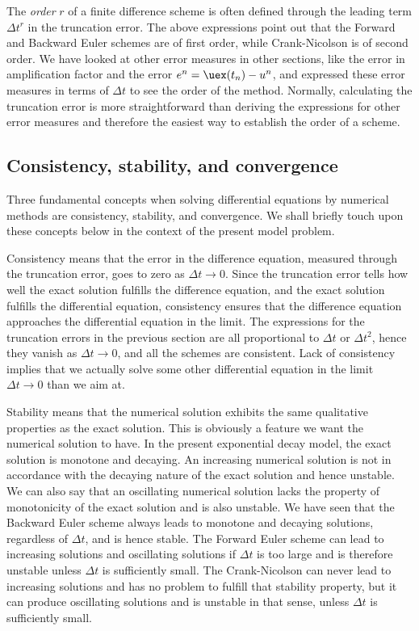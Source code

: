 \documentclass[graybox,sectrefs,envcountresetchap,open=right,final]{svmonodo}
\begin{document}
The \emph{order} $r$ of a finite difference scheme is often defined through
the leading term $\Delta t^r$ in the truncation error. The above
expressions point out that the Forward and Backward Euler schemes are
of first order, while Crank-Nicolson is of second order.  We have
looked at other error measures in other sections, like the error in
amplification factor and the error $e^n=\uex(t_n)-u^n$, and expressed
these error measures in terms of $\Delta t$ to see the order of the
method. Normally, calculating the truncation error is more
straightforward than deriving the expressions for other error measures
and therefore the easiest way to establish the order of a scheme.

\subsection{Consistency, stability, and convergence}

  

Three fundamental concepts when solving differential equations by
numerical methods are consistency, stability, and convergence.  We
shall briefly touch upon these concepts below in the context of the present
model problem.

Consistency means that the error in the difference equation, measured
through the truncation error, goes to zero as $\Delta t\rightarrow
0$. Since the truncation error tells how well the exact solution
fulfills the difference equation, and the exact solution fulfills the
differential equation, consistency ensures that the difference
equation approaches the differential equation in the limit. The
expressions for the truncation errors in the previous section are all
proportional to $\Delta t$ or $\Delta t^2$, hence they vanish as
$\Delta t\rightarrow 0$, and all the schemes are consistent.  Lack of
consistency implies that we actually solve some other differential
equation in the limit $\Delta t\rightarrow 0$ than we aim at.

Stability means that the numerical solution exhibits the same
qualitative properties as the exact solution. This is obviously a
feature we want the numerical solution to have. In the present
exponential decay model, the exact solution is monotone and
decaying. An increasing numerical solution is not in accordance with
the decaying nature of the exact solution and hence unstable. We can
also say that an oscillating numerical solution lacks the property of
monotonicity of the exact solution and is also unstable. We have seen
that the Backward Euler scheme always leads to monotone and decaying
solutions, regardless of $\Delta t$, and is hence stable. The Forward
Euler scheme can lead to increasing solutions and oscillating
solutions if $\Delta t$ is too large and is therefore unstable unless
$\Delta t$ is sufficiently small.  The Crank-Nicolson can never lead
to increasing solutions and has no problem to fulfill that stability
property, but it can produce oscillating solutions and is unstable in
that sense, unless $\Delta t$ is sufficiently small.
\end{document}
